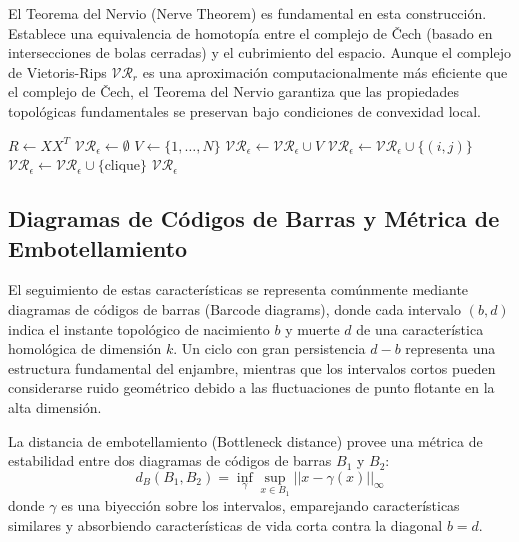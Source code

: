 El Teorema del Nervio (Nerve Theorem) es fundamental en esta construcción. Establece una equivalencia de homotopía entre el complejo de Čech (basado en intersecciones de bolas cerradas) y el cubrimiento del espacio. Aunque el complejo de Vietoris-Rips $\mathcal{VR}_r$ es una aproximación computacionalmente más eficiente que el complejo de Čech, el Teorema del Nervio garantiza que las propiedades topológicas fundamentales se preservan bajo condiciones de convexidad local.

\begin{algorithm}
\caption{Construcción del Complejo de Vietoris-Rips desde la Matriz de Similaridad Coseno}
\begin{algorithmic}[1]
    \State $R \gets X X^T$ 
    \State $\mathcal{VR}_\epsilon \gets \emptyset$
    \State $V \gets \{1, \dots, N\}$
    \State $\mathcal{VR}_\epsilon \gets \mathcal{VR}_\epsilon \cup V$ 
                \State $\mathcal{VR}_\epsilon \gets \mathcal{VR}_\epsilon \cup \{(i, j)\}$ 
            \EndIf
        \EndFor
    \EndFor
            \State $\mathcal{VR}_\epsilon \gets \mathcal{VR}_\epsilon \cup \{\text{clique}\}$ 
        \EndFor
    \EndFor
    \State \Return $\mathcal{VR}_\epsilon$
\EndProcedure
\end{algorithmic}
\end{algorithm}

\subsection{Diagramas de Códigos de Barras y Métrica de Embotellamiento}

El seguimiento de estas características se representa comúnmente mediante diagramas de códigos de barras (Barcode diagrams), donde cada intervalo $(b, d)$ indica el instante topológico de nacimiento $b$ y muerte $d$ de una característica homológica de dimensión $k$. Un ciclo con gran persistencia $d - b$ representa una estructura fundamental del enjambre, mientras que los intervalos cortos pueden considerarse ruido geométrico debido a las fluctuaciones de punto flotante en la alta dimensión.

La distancia de embotellamiento (Bottleneck distance) provee una métrica de estabilidad entre dos diagramas de códigos de barras $B_1$ y $B_2$:
$$ d_B(B_1, B_2) = \inf_{\gamma} \sup_{x \in B_1} || x - \gamma(x) ||_\infty $$
donde $\gamma$ es una biyección sobre los intervalos, emparejando características similares y absorbiendo características de vida corta contra la diagonal $b=d$.


